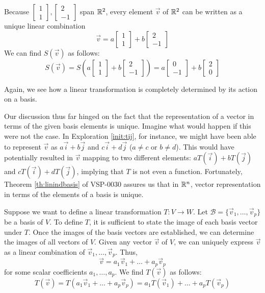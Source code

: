 \documentclass{ximera}
\begin{document}
\begin{exploration}
Because $\begin{bmatrix}1\\1\end{bmatrix},\begin{bmatrix}2\\-1\end{bmatrix}$ span $\mathbb{R}^2$, every element $\vec{v}$ of $\mathbb{R}^2$ can be written as a unique linear combination $$\vec{v}=a\begin{bmatrix}1\\1\end{bmatrix}+b\begin{bmatrix}2\\-1\end{bmatrix}$$
We can find $S(\vec{v})$ as follows:
$$S(\vec{v})=S\left(a\begin{bmatrix}1\\1\end{bmatrix}+b\begin{bmatrix}2\\-1\end{bmatrix}\right)=a\begin{bmatrix}0\\-1\end{bmatrix}+b\begin{bmatrix}2\\0\end{bmatrix}$$

Again, we see how a linear transformation is completely determined by its action on a basis.

\end{exploration}



Our discussion thus far hinged on the fact that the representation of a vector in terms of the given basis elements is unique.  Imagine what would happen if this were not the case.  In Exploration \ref{init:tij}, for instance, we might have been able to represent $\vec{v}$ as $a\vec{i}+b\vec{j}$ and $c\vec{i}+d\vec{j}$ ($a\neq c$ or $b\neq d$).  This would have potentially resulted in $\vec{v}$ mapping to two different elements: $aT(\vec{i})+bT(\vec{j})$ and $cT(\vec{i})+dT(\vec{j})$, implying that $T$ is not even a function.  Fortunately, Theorem \ref{th:linindbasis} of VSP-0030 assures us that in $\mathbb{R}^n$, vector representation in terms of the elements of a basis is unique.  

Suppose we want to define a linear transformation $T:V\rightarrow W$.  Let $\mathcal{B}=\{\vec{v}_1,\ldots,\vec{v}_p\}$ be a basis of $V$.  To define $T$, it is sufficient to state the image of each basis vector under $T$.  Once the images of the basis vectors are established, we can determine the images of all vectors of $V$.
Given any vector $\vec{v}$ of $V$, we can uniquely express $\vec{v}$ as a linear combination of $\vec{v}_1,\ldots,\vec{v}_p$.  Thus,
$$\vec{v}=a_1\vec{v}_1+\ldots+a_p\vec{v}_p$$ for some scalar coefficients $a_1,\ldots,a_p$.
We find $T(\vec{v})$ as follows:
$$T(\vec{v})=T(a_1\vec{v}_1+\ldots+a_p\vec{v}_p)=a_1T(\vec{v}_1)+\ldots+a_pT(\vec{v}_p)$$
\end{document}
